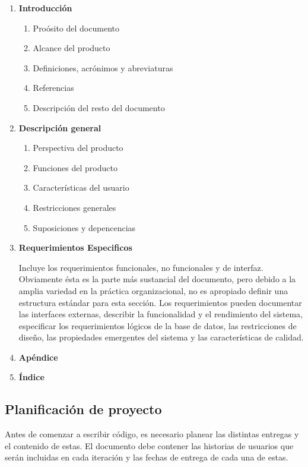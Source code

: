 \vspace{10mm}
\begin{framed}
     \begin{enumerate}
		\item \textbf{Introducción}
		\begin{enumerate}
			\item Proósito del documento
			\item Alcance del producto
			\item Definiciones, acrónimos y abreviaturas
			\item Referencias
			\item Descripción del resto del documento
		\end{enumerate}
		\item \textbf{Descripción general}
		\begin{enumerate}
			\item Perspectiva del producto
			\item Funciones del producto
			\item Características del usuario
			\item Restricciones generales
			\item Suposiciones y depencencias
		\end{enumerate}		
		\item \textbf{Requerimientos Especificos}

		Incluye los requerimientos funcionales, no funcionales y de interfaz. Obviamente ésta es la parte más sustancial del documento, pero debido a la amplia variedad en la práctica organizacional, no es apropiado definir una estructura estándar para esta sección. Los requerimientos pueden documentar las interfaces externas, describir la funcionalidad y el rendimiento del sistema, especificar los requerimientos lógicos de la base de datos, las restricciones de diseño, las propiedades emergentes del sistema y las características de calidad.
		\item \textbf{Apéndice}
		\item \textbf{Índice}
	\end{enumerate}
\end{framed}

\subsection{Planificación de proyecto}
Antes de comenzar a escribir código, es necesario planear las distintas entregas y el contenido de estas. El documento debe contener las historias de usuarios que serán incluidas en cada iteración y las fechas de entrega de cada una de estas.

